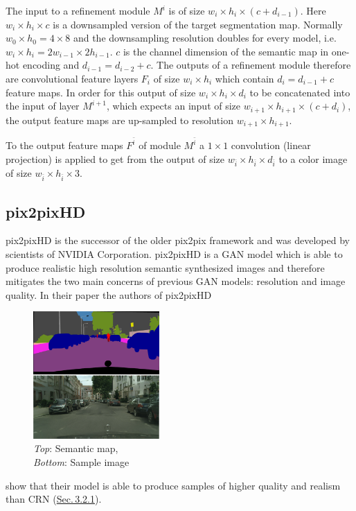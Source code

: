 The input to a refinement module $M^i$ is of size $w_i\times h_i\times(c + d_{i-1})$. Here $w_i\times h_i\times c$ is a downsampled version of the target segmentation map. Normally $w_0\times h_0=4\times 8$ and the downsampling resolution doubles for every model, i.e. $w_i\times h_i=2w_{i-1}\times2h_{i-1}$. $c$ is the channel dimension of the semantic map in one-hot encoding and $d_{i-1}=d_{i-2}+c$. The outputs of a refinement module therefore are convolutional feature layers $F_i$ of size $w_i\times h_i$ which contain $d_i=d_{i-1}+c$ feature maps. In order for this output of size $w_i\times h_i\times d_i$ to be concatenated into the input of layer $M^{i+1}$, which expects an input of size $w_{i+1}\times h_{i+1}\times (c + d_i)$, the output feature maps are up-sampled to resolution $w_{i+1}\times h_{i+1}$.

To the output feature maps $F^{\bar{i}}$ of module $M^{\bar{i}}$ a $1\times1$ convolution (linear projection) is applied to get from the output of size $w_{\bar{i}}\times h_{\bar{i}}\times d_{\bar{i}}$ to a color image of size $w_{\bar{i}}\times h_{\bar{i}}\times3$.

\subsection{pix2pixHD} \label{sec:3.2.2}
pix2pixHD \cite{pix2pixHD} is the successor of the older pix2pix \cite{pix2pix} framework and was developed by scientists of NVIDIA Corporation. pix2pixHD is a GAN model which is able to produce realistic high resolution semantic synthesized images and therefore mitigates the two main concerns of previous GAN models: resolution and image quality. In their paper the authors of pix2pixHD 
%
\begin{figure}
    \begin{center}
        \includegraphics[width=0.43\textwidth]{Chapters/figures/pix2pixHD_example.PNG}
    \end{center}
    \caption[]{\textit{Top}: Semantic map, \\\textit{Bottom}: Sample image}
\end{figure}
%
show that their model is able to produce samples of higher quality and realism than CRN (\hyperref[sec:3.2.1]{Sec.\,3.2.1}).

